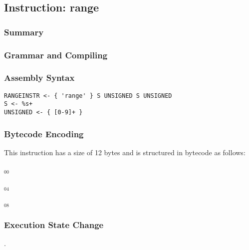 \subsection{Instruction: range}

\subsubsection{Summary}


\subsubsection{Grammar and Compiling}


\subsubsection{Assembly Syntax}

\begin{myquote}
\begin{verbatim}
RANGEINSTR <- { 'range' } S UNSIGNED S UNSIGNED
S <- %s+
UNSIGNED <- { [0-9]+ }
\end{verbatim}
\end{myquote}


\subsubsection{Bytecode Encoding}

This instruction has a size of 12 bytes and is structured in bytecode as follows:

$_{00}$\ 



$_{04}$\ 



$_{08}$\ 
\fbox{%
  \parbox{20pt}{%
00
  }%
}


\subsubsection{Execution State Change}

.


